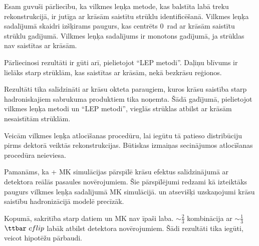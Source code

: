 Esam guvuši pārliecību, ka vilkmes leņķa metode, kas balstīta labā treku rekonstrukcijā, ir jutīga ar krāsām saistītu strūklu identificēšanā. Vilkmes leņķa sadalījumā skaidri izšķirams paugurs, kas centrēts 0~rad ar krāsām saistītu strūklu gadījumā. Vilkmes leņķa sadalījums ir monotons gadījumā, ja strūklas nav saistītas ar krāsām.

Pārliecinosi rezultāti ir gūti arī, pielietojot ``LEP metodi''. Daļiņu blīvums ir lielāks starp strūklām, kas saistītas ar krāsām, nekā bezkrāsu reģionos. 

Rezultāti tika salīdzināti ar krāsu okteta \PW paraugiem, kuros krāsu saistība starp hadroniskajiem sabrukuma produktiem tika noņemta. Šādā gadījumā, pielietojot vilkmes leņķa metodi un ``LEP metodi'', vieglās strūklas atbilst ar krāsām nesaistītām strūklām. 

Veicām vilkmes leņķa atlocīšanas procedūru, lai iegūtu tā patieso distribūciju pirms dektorā veiktās rekonstrukcijas. Būtiskas izmaiņas secinājumos atlocīšanas procedūra neieviesa.

Pamanāms, ka \POWHEG + \PYTHIA MK simulācijas pārspīlē krāsu efektus salīdzinājumā ar detektora reālās pasaules novērojumiem. Šie pārspīlējumi redzami kā izteiktāks paugurs vilkmes leņķa sadalījumā MK simulācijā. \HERWIGpp un atsevišķi \PYTHIA uzskaņojumi krāsu saistību hadronizācijā modelē precīzāk.

Kopumā, sakritība starp datiem un MK nav īpaši laba. $\sim\frac{2}{3}$ \ttbar kombinācija ar $\sim\frac{1}{3}$ $\ttbar\ cflip$ labāk atbilst detektora novērojumiem. Šādi rezultāti tika iegūti, veicot hipotēžu pārbaudi.
